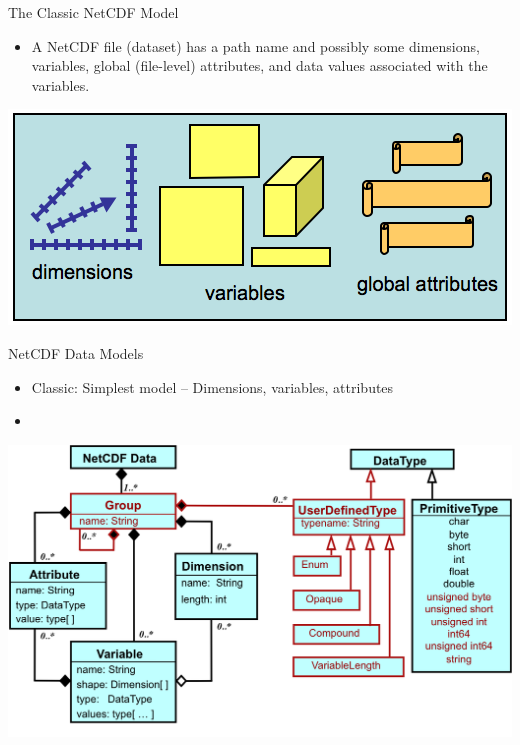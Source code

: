 \documentclass[compress,11pt,xcolor=svgnames,aspectratio=169]{beamer}
\begin{document}
\begin{frame}[fragile]{The Classic NetCDF Model}

\begin{itemize}

\item A NetCDF file (dataset) has a path name and possibly some dimensions, variables, global (file-level) attributes, and data values associated with the variables.

\end{itemize}

\begin{center}
\includegraphics[scale=0.6]{fig/netcdf-classic}
\end{center}

\nocite{netcdf}

\end{frame}

\begin{frame}[fragile]{NetCDF Data Models}

    \begin{itemize}

        \item Classic: Simplest model -- Dimensions, variables, attributes

        \item {\color{red}{Enhanced: More powerful model -- Adds groups, types, nesting}}

    \end{itemize}

    \begin{center}
    \includegraphics[scale=0.45]{fig/nc4-uml}
    \end{center}

\nocite{netcdf}

\end{frame}
\end{document}
